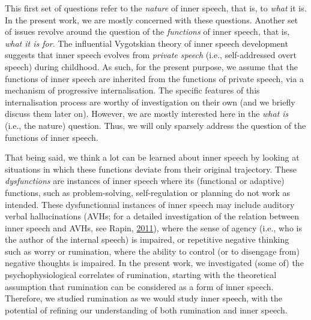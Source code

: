 \documentclass[a4paper,12pt,twoside,openright,oldfontcommands]{memoir}
\begin{document}
This first set of questions refer to the \emph{nature} of inner speech, that is, to \emph{what} it is. In the present work, we are mostly concerned with these questions. Another set of issues revolve around the question of the \emph{functions} of inner speech, that is, \emph{what it is for}. The influential Vygotskian theory of inner speech development suggests that inner speech evolves from \emph{private speech} (i.e., self-addressed overt speech) during childhood. As such, for the present purpose, we assume that the functions of inner speech are inherited from the functions of private speech, via a mechanism of progressive internalisation. The specific features of this internalisation process are worthy of investigation on their own (and we briefly discuss them later on). However, we are mostly interested here in the \emph{what is} (i.e., the nature) question. Thus, we will only sparsely address the question of the functions of inner speech.

That being said, we think a lot can be learned about inner speech by looking at situations in which these functions deviate from their original trajectory. These \emph{dysfunctions} are instances of inner speech where its (functional or adaptive) functions, such as problem-solving, self-regulation or planning do not work as intended. These dysfunctionnal instances of inner speech may include auditory verbal hallucinations (AVHs; for a detailed investigation of the relation between inner speech and AVHs, see Rapin, \protect\hyperlink{ref-Rapin2011}{2011}), where the sense of agency (i.e., who is the author of the internal speech) is impaired, or repetitive negative thinking such as worry or rumination, where the ability to control (or to disengage from) negative thoughts is impaired. In the present work, we investigated (some of) the psychophysiological correlates of rumination, starting with the theoretical assumption that rumination can be considered as a form of inner speech. Therefore, we studied rumination as we would study inner speech, with the potential of refining our understanding of both rumination and inner speech.
\end{document}
